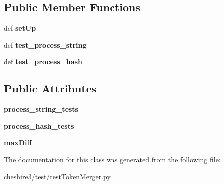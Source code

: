 \subsection*{Public Member Functions}
\begin{DoxyCompactItemize}
\item 
\hypertarget{classcheshire3_1_1test_1_1test_token_merger_1_1_token_merger_test_case_a40da6f974bb7da9dfce7f5855e71f750}{def {\bfseries set\-Up}}\label{classcheshire3_1_1test_1_1test_token_merger_1_1_token_merger_test_case_a40da6f974bb7da9dfce7f5855e71f750}

\item 
\hypertarget{classcheshire3_1_1test_1_1test_token_merger_1_1_token_merger_test_case_a16a32646a8d48761ea1d3522687301b2}{def {\bfseries test\-\_\-process\-\_\-string}}\label{classcheshire3_1_1test_1_1test_token_merger_1_1_token_merger_test_case_a16a32646a8d48761ea1d3522687301b2}

\item 
\hypertarget{classcheshire3_1_1test_1_1test_token_merger_1_1_token_merger_test_case_a47afbc5fbb0652e744afed1531aafa6b}{def {\bfseries test\-\_\-process\-\_\-hash}}\label{classcheshire3_1_1test_1_1test_token_merger_1_1_token_merger_test_case_a47afbc5fbb0652e744afed1531aafa6b}

\end{DoxyCompactItemize}
\subsection*{Public Attributes}
\begin{DoxyCompactItemize}
\item 
\hypertarget{classcheshire3_1_1test_1_1test_token_merger_1_1_token_merger_test_case_ab982162608a0e5dc539fb749748d3983}{{\bfseries process\-\_\-string\-\_\-tests}}\label{classcheshire3_1_1test_1_1test_token_merger_1_1_token_merger_test_case_ab982162608a0e5dc539fb749748d3983}

\item 
\hypertarget{classcheshire3_1_1test_1_1test_token_merger_1_1_token_merger_test_case_aeed5c53947a292b20a2b92fde48cf0d7}{{\bfseries process\-\_\-hash\-\_\-tests}}\label{classcheshire3_1_1test_1_1test_token_merger_1_1_token_merger_test_case_aeed5c53947a292b20a2b92fde48cf0d7}

\item 
\hypertarget{classcheshire3_1_1test_1_1test_token_merger_1_1_token_merger_test_case_abd149e1c6a6725d21c6aabb58bfd669b}{{\bfseries max\-Diff}}\label{classcheshire3_1_1test_1_1test_token_merger_1_1_token_merger_test_case_abd149e1c6a6725d21c6aabb58bfd669b}

\end{DoxyCompactItemize}


The documentation for this class was generated from the following file\-:\begin{DoxyCompactItemize}
\item 
cheshire3/test/test\-Token\-Merger.\-py\end{DoxyCompactItemize}

